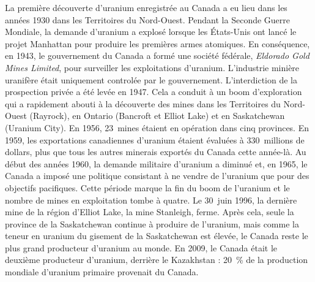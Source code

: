 \documentclass{article}
\begin{document}
La première découverte d'uranium enregistrée au Canada a eu lieu dans les années 1930 dans les Territoires du Nord-Ouest. %
Pendant la Seconde Guerre Mondiale, la demande d'uranium a explosé lorsque les États-Unis ont lancé le projet Manhattan pour produire les premières armes atomiques. En conséquence, en 1943, le gouvernement du Canada a formé une société fédérale, \textit{Eldorado Gold Mines Limited}, pour surveiller les exploitations d'uranium. L'industrie minière uranifère était uniquement controlée par le gouvernement.
L'interdiction de la prospection privée a été levée en 1947. Cela a conduit à un boom d'exploration qui a rapidement abouti à la découverte des mines dans les Territoires du Nord-Ouest (Rayrock), en Ontario (Bancroft et Elliot Lake) et en Saskatchewan (Uranium City). En 1956, 23~mines étaient en opération dans cinq provinces. En 1959, les exportations canadiennes d'uranium étaient évaluées à 330~millions de dollars, plus que tous les autres minerais exportés du Canada cette année-là. Au début des années 1960, la demande militaire d'uranium a diminué et, en 1965, le Canada a imposé une politique consistant à ne vendre de l'uranium que pour des objectifs pacifiques. Cette période marque la fin du boom de l'uranium et le nombre de mines en exploitation tombe à quatre.
Le 30~juin 1996, la dernière mine de la région d'Elliot Lake, la mine Stanleigh, ferme. Après cela, seule la province de la Saskatchewan continue à produire de l'uranium, mais comme la teneur en uranium du gisement de la Saskatchewan est élevée, le Canada reste le plus grand producteur d'uranium au monde. En 2009, le Canada était le deuxième producteur d’uranium, derrière le Kazakhstan : 20~\% de la production mondiale d'uranium primaire provenait du Canada.
\end{document}
